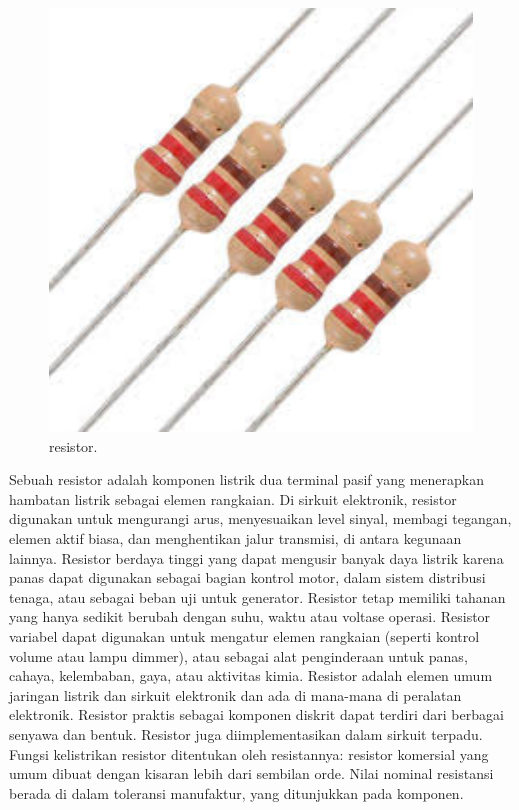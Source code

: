 \begin{figure}[ht]
	\centerline{\includegraphics[width=1\textwidth]{figures/resistor.JPG}}
	\caption{resistor.}
	\label{resistor}
\end{figure}
	
Sebuah resistor adalah komponen listrik dua terminal pasif yang menerapkan hambatan listrik sebagai elemen rangkaian. Di sirkuit elektronik, resistor digunakan 
untuk mengurangi arus, menyesuaikan level sinyal, membagi tegangan, elemen aktif biasa, dan menghentikan jalur transmisi, di antara kegunaan lainnya. Resistor 
berdaya tinggi yang dapat mengusir banyak daya listrik karena panas dapat digunakan sebagai bagian kontrol motor, dalam sistem distribusi tenaga, atau sebagai 
beban uji untuk generator. Resistor tetap memiliki tahanan yang hanya sedikit berubah dengan suhu, waktu atau voltase operasi. Resistor variabel dapat digunakan 
untuk mengatur elemen rangkaian (seperti kontrol volume atau lampu dimmer), atau sebagai alat penginderaan untuk panas, cahaya, kelembaban, gaya, atau aktivitas 
kimia. Resistor adalah elemen umum jaringan listrik dan sirkuit elektronik dan ada di mana-mana di peralatan elektronik. Resistor praktis sebagai komponen diskrit dapat terdiri dari berbagai senyawa dan bentuk. Resistor juga diimplementasikan dalam sirkuit terpadu.
Fungsi kelistrikan resistor ditentukan oleh resistannya: resistor komersial yang umum dibuat dengan kisaran lebih dari sembilan orde. Nilai nominal resistansi berada di dalam toleransi manufaktur, yang ditunjukkan pada komponen.
